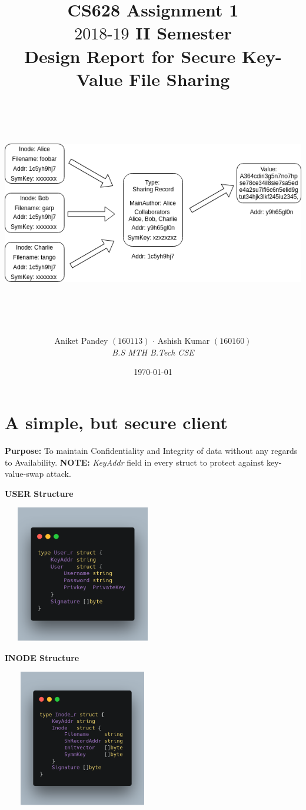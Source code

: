 \documentclass[a4paper, 12pt]{scrartcl}
\title{\vspace{10mm}CS628 Assignment 1 \\ $2018\text{-}19$  II Semester \\ \vspace{1cm} \textbf{Design Report for Secure Key-Value File Sharing}}
\subtitle{\vspace{4mm}\includegraphics[width=\textwidth, height=10cm]{images/cs628.png}\vspace{20mm}}
\author{Aniket Pandey $(160113)$ \hspace{5mm} $\cdot$ \hspace{5mm} Ashish Kumar $(160160)$ \\ \textit{B.S MTH} \hspace{45mm} \textit{B.Tech CSE}}
\date{\today}
\begin{document}
\clearpage\maketitle
\thispagestyle{empty}
\newpage


\section{A simple, but secure client}
\textbf{Purpose:} To maintain Confidentiality and Integrity of data without any regards to Availability.
\textbf{NOTE:} \textit{KeyAddr} field in every struct to protect against key-value-swap attack.

\begin{multicols}{2}

\begin{center}
	\textbf{USER Structure}
\end{center}

\begin{center}
	\includegraphics[width=7cm, height=6cm]{images/user.png}
\end{center}

\columnbreak

\begin{center}
	\textbf{INODE Structure}
\end{center}

\begin{center}
	\includegraphics[width=7cm, height=6cm]{images/inode.png}
\end{center}

\end{multicols}
\end{document}
